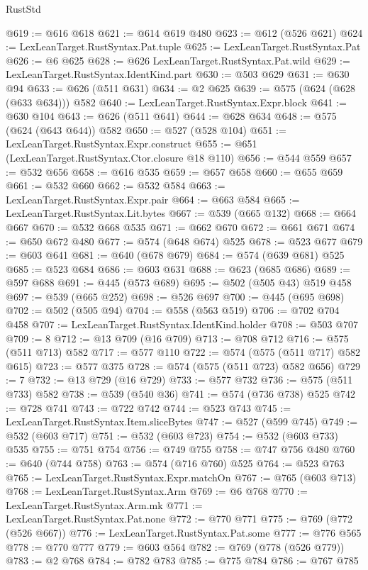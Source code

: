\begin{lexlean}{RustStd}
\begin{coremodule}
@619 := @616 @618
@621 := @614 @619 @480
@623 := @612 (@526 @621)
@624 := LexLeanTarget.RustSyntax.Pat.tuple
@625 := LexLeanTarget.RustSyntax.Pat
@626 := @6 @625
@628 := @626 LexLeanTarget.RustSyntax.Pat.wild
@629 := LexLeanTarget.RustSyntax.IdentKind.part
@630 := @503 @629
@631 := @630 @94
@633 := @626 (@511 @631)
@634 := @2 @625
@639 := @575 (@624 (@628 (@633 @634))) @582
@640 := LexLeanTarget.RustSyntax.Expr.block
@641 := @630 @104
@643 := @626 (@511 @641)
@644 := @628 @634
@648 := @575 (@624 (@643 @644)) @582
@650 := @527 (@528 @104)
@651 := LexLeanTarget.RustSyntax.Expr.construct
@655 := @651 (LexLeanTarget.RustSyntax.Ctor.closure @18 @110)
@656 := @544 @559
@657 := @532 @656
@658 := @616 @535
@659 := @657 @658
@660 := @655 @659
@661 := @532 @660
@662 := @532 @584
@663 := LexLeanTarget.RustSyntax.Expr.pair
@664 := @663 @584
@665 := LexLeanTarget.RustSyntax.Lit.bytes
@667 := @539 (@665 @132)
@668 := @664 @667
@670 := @532 @668 @535
@671 := @662 @670
@672 := @661 @671
@674 := @650 @672 @480
@677 := @574 (@648 @674) @525
@678 := @523 @677
@679 := @603 @641
@681 := @640 (@678 @679)
@684 := @574 (@639 @681) @525
@685 := @523 @684
@686 := @603 @631
@688 := @623 (@685 @686)
@689 := @597 @688
@691 := @445 (@573 @689)
@695 := @502 (@505 @43) @519 @458
@697 := @539 (@665 @252)
@698 := @526 @697
@700 := @445 (@695 @698)
@702 := @502 (@505 @94)
@704 := @558 (@563 @519)
@706 := @702 @704 @458
@707 := LexLeanTarget.RustSyntax.IdentKind.holder
@708 := @503 @707
@709 := 8
@712 := @13 @709 (@16 @709)
@713 := @708 @712
@716 := @575 (@511 @713) @582
@717 := @577 @110
@722 := @574 (@575 (@511 @717) @582 @615)
@723 := @577 @375
@728 := @574 (@575 (@511 @723) @582 @656)
@729 := 7
@732 := @13 @729 (@16 @729)
@733 := @577 @732
@736 := @575 (@511 @733) @582
@738 := @539 (@540 @36)
@741 := @574 (@736 @738) @525
@742 := @728 @741
@743 := @722 @742
@744 := @523 @743
@745 := LexLeanTarget.RustSyntax.Item.sliceBytes
@747 := @527 (@599 @745)
@749 := @532 (@603 @717)
@751 := @532 (@603 @723)
@754 := @532 (@603 @733) @535
@755 := @751 @754
@756 := @749 @755
@758 := @747 @756 @480
@760 := @640 (@744 @758)
@763 := @574 (@716 @760) @525
@764 := @523 @763
@765 := LexLeanTarget.RustSyntax.Expr.matchOn
@767 := @765 (@603 @713)
@768 := LexLeanTarget.RustSyntax.Arm
@769 := @6 @768
@770 := LexLeanTarget.RustSyntax.Arm.mk
@771 := LexLeanTarget.RustSyntax.Pat.none
@772 := @770 @771
@775 := @769 (@772 (@526 @667))
@776 := LexLeanTarget.RustSyntax.Pat.some
@777 := @776 @565
@778 := @770 @777
@779 := @603 @564
@782 := @769 (@778 (@526 @779))
@783 := @2 @768
@784 := @782 @783
@785 := @775 @784
@786 := @767 @785

\end{coremodule}
\end{lexlean}
